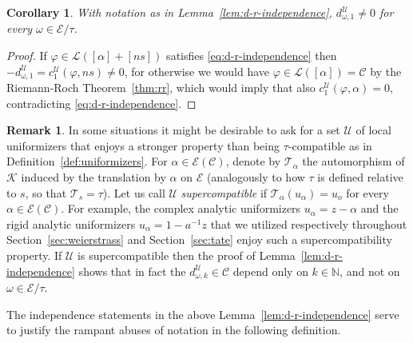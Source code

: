 \documentclass[preprint,12pt]{elsarticle}
\numberwithin{equation}{section} %
\theoremstyle{theorem}
\newtheorem{corollary}[theorem]{Corollary}
\theoremstyle{definition}
\newtheorem{remark}[theorem]{Remark}
\newcommand{\Ca}{\mathcal{C}} %
\newcommand{\bk}{\mathcal{K}} %
\newcommand{\ec}{\mathcal{E}} %
\newcommand{\idec}{{o}} %
\newcommand{\orbita}{{\ec/\tau}} %
\begin{document}
    \begin{corollary}\label{cor:d-r-independence}
        With notation as in Lemma~\ref{lem:d-r-independence}, $d^\mathcal{U}_{\omega,1}\neq 0$ for every $\omega\in\orbita$.
    \end{corollary}

    \begin{proof}
        If $\varphi\in\mathcal{L}([\alpha]+[ns])$ satisfies \eqref{eq:d-r-independence} then $-d^\mathcal{U}_{\omega,1}=c^\mathcal{U}_1(\varphi,ns)\neq 0$, for otherwise we would have $\varphi\in\mathcal{L}([\alpha])=\Ca$ by the Riemann-Roch Theorem~\ref{thm:rr}, which would imply that also $c_1^\mathcal{U}(\varphi,\alpha)=0$, contradicting \eqref{eq:d-r-independence}.
    \end{proof}

    \begin{remark}\label{rem:super-compatible-d-independence} In some situations it might be desirable to ask for a set $\mathcal{U}$ of local uniformizers that enjoys a stronger property than being $\tau$-compatible as in Definition~\ref{def:uniformizers}. For $\alpha\in\ec(\Ca)$, denote by $\mathcal{T}_\alpha$ the automorphism of $\bk$ induced by the translation by $\alpha$ on $\ec$ (analogously to how $\tau$ is defined relative to $s$, so that $\mathcal{T}_s=\tau$). Let us call $\mathcal{U}$ \emph{supercompatible} if $\mathcal{T}_\alpha(u_\alpha)=u_\idec$ for every $\alpha\in\ec(\Ca)$. For example, the complex analytic uniformizers $u_\alpha=z-\alpha$ and the rigid analytic uniformizers $u_\alpha=1-a^{-1}z$ that we utilized respectively throughout Section~\ref{sec:weierstrass} and Section~\ref{sec:tate} enjoy such a supercompatibility property. If $\mathcal{U}$ is supercompatible then the proof of Lemma~\ref{lem:d-r-independence} shows that in fact the $d^\mathcal{U}_{\omega,k}\in\Ca$ depend only on $k\in\mathbb{N}$, and not on $\omega\in\orbita$.  
    \end{remark}

The independence statements in the above Lemma~\ref{lem:d-r-independence} serve to justify the rampant abuses of notation in the following definition.
\end{document}
